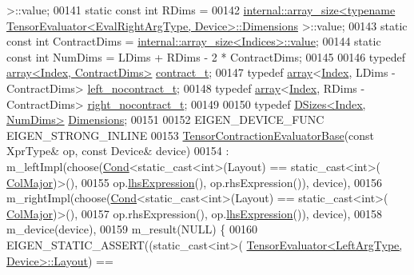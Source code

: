 \begin{DoxyCode}
      >::value;
00141   \textcolor{keyword}{static} \textcolor{keyword}{const} \textcolor{keywordtype}{int} RDims =
00142       
      \hyperlink{struct_eigen_1_1internal_1_1array__size}{internal::array\_size<typename TensorEvaluator<EvalRightArgType, Device>::Dimensions}
      >::value;
00143   \textcolor{keyword}{static} \textcolor{keyword}{const} \textcolor{keywordtype}{int} ContractDims = \hyperlink{struct_eigen_1_1internal_1_1array__size}{internal::array\_size<Indices>::value};
00144   \textcolor{keyword}{static} \textcolor{keyword}{const} \textcolor{keywordtype}{int} NumDims = LDims + RDims - 2 * ContractDims;
00145 
00146   \textcolor{keyword}{typedef} \hyperlink{class_eigen_1_1array}{array<Index, ContractDims>} \hyperlink{class_eigen_1_1array}{contract\_t};
00147   \textcolor{keyword}{typedef} \hyperlink{class_eigen_1_1array}{array}<\hyperlink{namespace_eigen_a62e77e0933482dafde8fe197d9a2cfde}{Index}, LDims - ContractDims> \hyperlink{class_eigen_1_1array}{left\_nocontract\_t};
00148   \textcolor{keyword}{typedef} \hyperlink{class_eigen_1_1array}{array}<\hyperlink{namespace_eigen_a62e77e0933482dafde8fe197d9a2cfde}{Index}, RDims - ContractDims> \hyperlink{class_eigen_1_1array}{right\_nocontract\_t};
00149 
00150   \textcolor{keyword}{typedef} \hyperlink{struct_eigen_1_1_d_sizes}{DSizes<Index, NumDims>} \hyperlink{struct_eigen_1_1_d_sizes}{Dimensions};
00151 
00152   EIGEN\_DEVICE\_FUNC EIGEN\_STRONG\_INLINE
00153   \hyperlink{struct_eigen_1_1_tensor_contraction_evaluator_base}{TensorContractionEvaluatorBase}(\textcolor{keyword}{const} XprType& op, \textcolor{keyword}{const} Device& device)
00154     : m\_leftImpl(choose(\hyperlink{struct_eigen_1_1_cond}{Cond}<static\_cast<int>(Layout) == static\_cast<int>(
      \hyperlink{group__enums_ggaacded1a18ae58b0f554751f6cdf9eb13a0cbd4bdd0abcfc0224c5fcb5e4f6669a}{ColMajor})>(),
00155                           op.\hyperlink{class_eigen_1_1_tensor_contraction_op_a1e3bb92babac5554f7164b12e9654daa}{lhsExpression}(), op.rhsExpression()), device),
00156     m\_rightImpl(choose(\hyperlink{struct_eigen_1_1_cond}{Cond}<static\_cast<int>(Layout) == static\_cast<int>(
      \hyperlink{group__enums_ggaacded1a18ae58b0f554751f6cdf9eb13a0cbd4bdd0abcfc0224c5fcb5e4f6669a}{ColMajor})>(),
00157                           op.rhsExpression(), op.\hyperlink{class_eigen_1_1_tensor_contraction_op_a1e3bb92babac5554f7164b12e9654daa}{lhsExpression}()), device),
00158         m\_device(device),
00159         m\_result(NULL) \{
00160     EIGEN\_STATIC\_ASSERT((static\_cast<int>(
      \hyperlink{struct_eigen_1_1_tensor_evaluator}{TensorEvaluator<LeftArgType, Device>::Layout}) ==

\end{DoxyCode}

